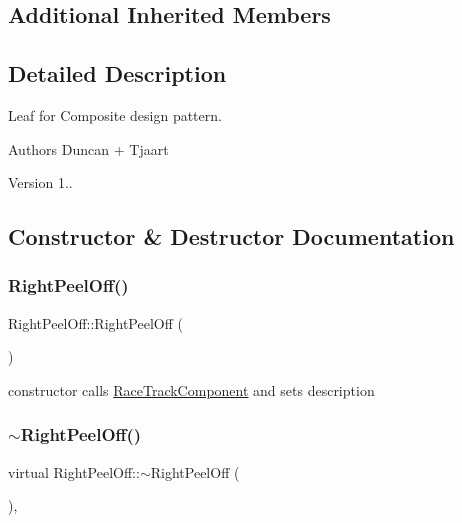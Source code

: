 \subsection*{Additional Inherited Members}


\subsection{Detailed Description}
Leaf for Composite design pattern. 

\begin{DoxyAuthor}{Authors}
Duncan + Tjaart 
\end{DoxyAuthor}
\begin{DoxyVersion}{Version}
1.. 
\end{DoxyVersion}


\subsection{Constructor \& Destructor Documentation}
\mbox{\label{class_right_peel_off_a04e04180e4adf8b6fbafd75c99007b2a}} 
\subsubsection{\texorpdfstring{Right\+Peel\+Off()}{RightPeelOff()}}
{\footnotesize\ttfamily Right\+Peel\+Off\+::\+Right\+Peel\+Off (\begin{DoxyParamCaption}{ }\end{DoxyParamCaption})\hspace{0.3cm}{\ttfamily [inline]}}

constructor calls \mbox{\hyperlink{class_race_track_component}{Race\+Track\+Component}} and sets description \mbox{\label{class_right_peel_off_a5698ead1b07ecf9147f35828e76fe269}} 
\subsubsection{\texorpdfstring{$\sim$\+Right\+Peel\+Off()}{~RightPeelOff()}}
{\footnotesize\ttfamily virtual Right\+Peel\+Off\+::$\sim$\+Right\+Peel\+Off (\begin{DoxyParamCaption}{ }\end{DoxyParamCaption})\hspace{0.3cm}{\ttfamily [inline]}, {\ttfamily [virtual]}}

